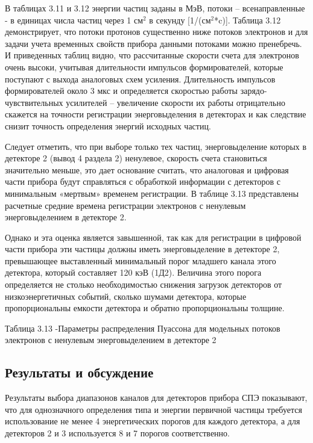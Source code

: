 В таблицах 3.11 и 3.12 энергии частиц заданы в МэВ, потоки – всенаправленные - в единицах числа частиц через 1 см$ ^2 $  в секунду  [1/(см$ ^2 $*c)].  Таблица 3.12 демонстрирует, что потоки протонов существенно ниже потоков электронов и для задачи учета временных свойств прибора данными потоками можно пренебречь.
И приведенных таблиц видно, что рассчитанные скорости счета для электронов очень высоки, учитывая длительности импульсов формирователей, которые поступают с выхода аналоговых схем усиления. Длительность импульсов формирователей около 3 мкс и определяется скоростью работы зарядо-чувствительных усилителей – увеличение скорости их работы отрицательно скажется на точности регистрации энерговыделения в детекторах и как следствие снизит точность определения энергий исходных частиц.

Следует отметить, что при выборе только тех частиц, энерговыделение которых в детекторе 2 (вывод 4 раздела 2) ненулевое, скорость счета становиться значительно меньше, это дает основание считать, что аналоговая и цифровая части прибора будут справляться с обработкой информации с детекторов с минимальным «мертвым» временем регистрации. В таблице 3.13 представлены расчетные средние времена регистрации электронов с ненулевым энерговыделением в детекторе 2. 

Однако и эта оценка является завышенной, так как для регистрации в цифровой части прибора эти частицы должны иметь энерговыделение в детекторе 2, превышающее выставленный минимальный порог младшего канала этого детектора, который составляет 120 кэВ (1Д2). Величина этого порога определяется не столько необходимостью снижения загрузок детекторов от низкоэнергетичных событий, сколько шумами детектора, которые пропорциональны емкости детектора и обратно пропорциональны толщине.


Таблица 3.13 -Параметры распределения Пуассона для модельных потоков электронов с ненулевым энерговыделением в детекторе 2

\subsection{Результаты и обсуждение}


Результаты выбора диапазонов каналов для детекторов прибора СПЭ показывают, что для однозначного определения типа и энергии первичной частицы требуется использование не менее 4 энергетических порогов для каждого детектора, а для детекторов 2 и 3 используется 8 и 7 порогов соответственно. 

